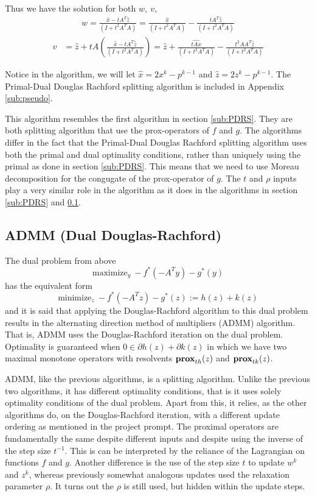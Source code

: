 \documentclass{article}
\theoremstyle{definition}
\theoremstyle{remark}
\begin{document}
Thus we have the solution for both $w, \ v$, 
\begin{align}
  w = \frac{\hat{x} - tA^T \hat{z}}{(I + t^2A^T A)} = \frac{\hat{x}}{(I + t^2A^T A)} - \frac{tA^T \hat{z}}{(I + t^2A^T A)}
\end{align}
\begin{align}
  v &= \hat{z} + tA \left(\frac{\hat{x} - tA^T \hat{z}}{(I + t^2A^T A)}\right) = \hat{z} + \frac{\hat{tAx}}{(I + t^2A^T A)} - \frac{t^2 A A^T \hat{z}}{(I + t^2A^T A)}
\end{align}

Notice in the algorithm, we will let $\hat{x} = 2x^k - p^{k-1}$ and $\hat{z} = 2z^k - p^{k-1}$. The Primal-Dual Douglas Rachford splitting algorithm is included in Appendix \ref{sub:pseudo}.

This algorithm resembles the first algorithm in section \ref{sub:PDRS}. They are both splitting algorithm that use the prox-operators of $f$ and $g$. The algorithms differ in the fact that the Primal-Dual Douglas Rachford splitting algorithm uses both the primal and dual optimality conditions, rather than uniquely using the primal as done in section \ref{sub:PDRS}. This means that we need to use Moreau decomposition for the congugate of the prox-operator of $g$. The $t$ and $\rho$ inputs play a very similar role in the algorithm as it does in the algorithms in section \ref{sub:PDRS} and \ref{sub: ADMM}. 

\subsection{ADMM (Dual Douglas-Rachford)}  \label{sub: ADMM}
The dual problem from above
\begin{equation}
  \text{maximize}_y \ -f^*(-A^T y) - g^*(y)
\end{equation}
has the equivalent form
$$
\text{minimize}_z \ -f^*(-A^T z) - g^*(z) := h(z) + k(z)
$$
and it is said that applying the Douglas-Rachford algorithm to this dual problem results in the alternating direction method of multipliers (ADMM) algorithm. That is, ADMM uses the Douglas-Rachford iteration on the dual problem. Optimality is guaranteed when $0 \in \partial h(z) + \partial k(z)$ in which we have two maximal monotone operators with resolvents $\operatorname{\mathbf{prox}}_{th}(z)$ and $\operatorname{\mathbf{prox}}_{tk}(z)$. 

\medskip

ADMM, like the previous algorithms, is a splitting algorithm. Unlike the previous two algorithms, it has different optimality conditions, that is it uses solely optimality conditions of the dual problem. Apart from this, it relies, as the other algorithms do, on the Douglas-Rachford iteration, with a different update ordering as mentioned in the project prompt. The proximal operators are fundamentally the same despite different inputs and despite using the inverse of the step size $t^{-1}$. This is can be interpreted by the reliance of the Lagrangian on functions $f$ and $g$. Another difference is the use of the step size $t$ to update $w^k$ and $z^k$, whereas previously somewhat analogous updates used the relaxation parameter $\rho$. It turns out the $\rho$ is still used, but hidden within the update steps.
\end{document}

